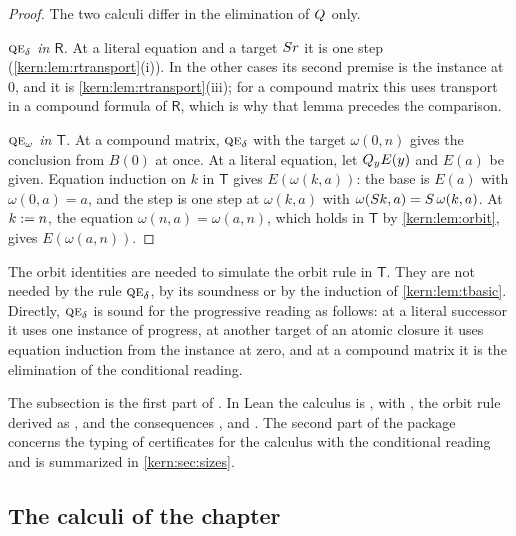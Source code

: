 \begin{proof}
The two calculi differ in the elimination of $Q_{}$ only.

\emph{$\rulename{QE}_{\delta}$ in $\mathsf{R}$.}  At a literal equation and
a target $S r$ it is one step (\cref{kern:lem:rtransport}(i)).  In the
other cases its second premise is the instance at $0$, and it is
\cref{kern:lem:rtransport}(iii); for a compound matrix this uses transport
in a compound formula of $\mathsf{R}$, which is why that lemma precedes the
comparison.

\emph{$\rulename{QE}_{\omega}$ in $\mathsf{T}$.}  At a compound matrix,
$\rulename{QE}_{\delta}$ with the target $\omega(0,n)$ gives the conclusion
from $B(0)$ at once.  At a literal equation, let $Q_{y}E(y)$ and $E(a)$ be
given.  Equation induction on $k$ in $\mathsf{T}$ gives $E(\omega(k,a))$:
the base is $E(a)$ with $\omega(0,a)=a$, and the step is one step at
$\omega(k,a)$ with $\omega(S k,a)=S\,\omega(k,a)$.  At $k\mathrel{:=} n$,
the equation $\omega(n,a)=\omega(a,n)$, which holds in $\mathsf{T}$ by
\cref{kern:lem:orbit}, gives $E(\omega(a,n))$.
\end{proof}

The orbit identities are needed to simulate the orbit rule in $\mathsf{T}$.
They are not needed by the rule $\rulename{QE}_{\delta}$, by its soundness
or by the induction of \cref{kern:lem:tbasic}.  Directly, $\rulename{QE}_{\delta}$
is sound for the progressive reading as follows: at a literal successor it
uses one instance of progress, at another target of an atomic closure it
uses equation induction from the instance at zero, and at a compound matrix
it is the elimination of the conditional reading.

\begin{remark}
\label{kern:rem:target-sources}
The subsection is the first part of .  In Lean the
calculus is , with , the orbit rule
derived as , and the consequences
,  and .
The second part of the package concerns the typing of certificates for the
calculus with the conditional reading and is summarized in
\cref{kern:sec:sizes}.
\end{remark}

\subsection{The calculi of the chapter}
\label{kern:sec:table}

